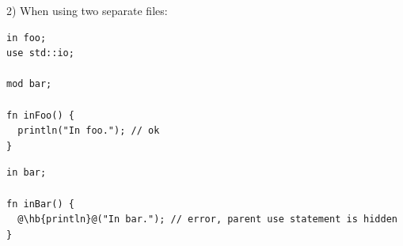 2) When using two separate files:

\hspace{-0.03\linewidth}%
\begin{minipage}[t][][t]{0.3\linewidth}%
\begin{lstlisting}[caption=\textit{./foo.yr}, style=coloredverbatim]
in foo;
use std::io;

mod bar;

fn inFoo() {
  println("In foo."); // ok
}
\end{lstlisting}
\end{minipage}%
\hspace{0.02\linewidth}%
\begin{minipage}[t][][t]{0.65\linewidth}
\begin{lstlisting}[caption=\textit{./foo/bar.yr}, style=coloredverbatimError, escapechar=@]
in bar;

fn inBar() {
  @\hb{println}@("In bar."); // error, parent use statement is hidden
}
\end{lstlisting}
\end{minipage}%

\vfill%
\pagebreak
